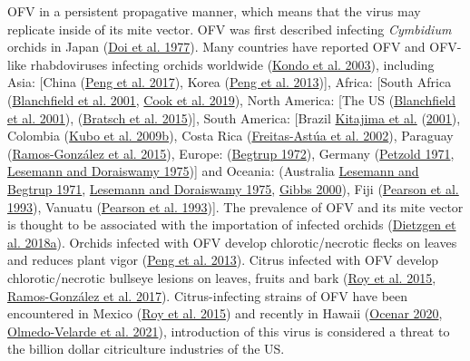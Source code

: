 \documentclass[12pt,final,CPage]{ufthesis}
\begin{document}
{OFV in a persistent propagative manner, which means that the virus may replicate inside of its mite vector. OFV was first described infecting \emph{Cymbidium} orchids in Japan (\protect\hyperlink{ref-Doi1977}{Doi et al. 1977}). Many countries have reported OFV and OFV-like rhabdoviruses infecting orchids worldwide (\protect\hyperlink{ref-Kondo2003}{Kondo et al. 2003}), including Asia: {[}China (\protect\hyperlink{ref-Peng2017}{Peng et al. 2017}), Korea (\protect\hyperlink{ref-Peng2013}{Peng et al. 2013}){]}, Africa: {[}South Africa (\protect\hyperlink{ref-Blanchfield2001}{Blanchfield et al. 2001}, \protect\hyperlink{ref-Cook2019}{Cook et al. 2019}), North America: {[}The US (\protect\hyperlink{ref-Blanchfield2001}{Blanchfield et al. 2001}), (\protect\hyperlink{ref-Bratsch2015}{Bratsch et al. 2015}){]}, South America: {[}Brazil \protect\hyperlink{ref-Kitajima2001}{Kitajima et al.} (\protect\hyperlink{ref-Kitajima2001}{2001}), Colombia (\protect\hyperlink{ref-Kubo2009}{Kubo et al. 2009b}), Costa Rica (\protect\hyperlink{ref-FreitasAstua2002}{Freitas-Astúa et al. 2002}), Paraguay (\protect\hyperlink{ref-RamosGonzalez2015}{Ramos-González et al. 2015}), Europe: (\protect\hyperlink{ref-Begtrup1972}{Begtrup 1972}), Germany (\protect\hyperlink{ref-Petzold1971}{Petzold 1971}, \protect\hyperlink{ref-Lesemann1975}{Lesemann and Doraiswamy 1975}){]} and Oceania: (Australia \protect\hyperlink{ref-Lesemann1971}{Lesemann and Begtrup 1971}, \protect\hyperlink{ref-Lesemann1975}{Lesemann and Doraiswamy 1975}, \protect\hyperlink{ref-Gibbs2000}{Gibbs 2000}), Fiji (\protect\hyperlink{ref-Pearson1993}{Pearson et al. 1993}), Vanuatu (\protect\hyperlink{ref-Pearson1993}{Pearson et al. 1993}){]}. The prevalence of OFV and its mite vector is thought to be associated with the importation of infected orchids (\protect\hyperlink{ref-Dietzgen2018}{Dietzgen et al. 2018a}). Orchids infected with OFV develop chlorotic/necrotic flecks on leaves and reduces plant vigor (\protect\hyperlink{ref-Peng2013}{Peng et al. 2013}). Citrus infected with OFV develop chlorotic/necrotic bullseye lesions on leaves, fruits and bark (\protect\hyperlink{ref-Roy2015}{Roy et al. 2015}, \protect\hyperlink{ref-RamosGonzalez2017}{Ramos-González et al. 2017}). Citrus-infecting strains of OFV have been encountered in Mexico (\protect\hyperlink{ref-Roy2015}{Roy et al. 2015}) and recently in Hawaii (\protect\hyperlink{ref-Ocenar2020}{Ocenar 2020}, \protect\hyperlink{ref-Velarde2021}{Olmedo-Velarde et al. 2021}), introduction of this virus is considered a threat to the billion dollar citriculture industries of the US.
  \begin{figure}


\end{figure}}
\end{document}
